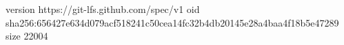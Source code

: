 version https://git-lfs.github.com/spec/v1
oid sha256:656427e634d079acf518241c50cea14fc32b4db20145e28a4baa4f18b5e47289
size 22004
